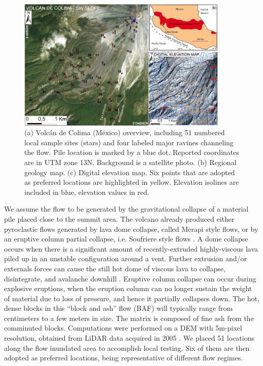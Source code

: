 \documentclass{article}
\begin{document}
\begin{figure}[H]
    \includegraphics[width=0.9\textwidth]{BAF_VolcanDeColima/ColimaFig.jpg}
    \centering
    \caption{(a) Volc{\'a}n de Colima (M{\'e}xico) overview, including 51 numbered local sample sites (stars) and four labeled major ravines channeling the flow. Pile location is marked by a blue dot. Reported coordinates are in UTM zone 13N. Background is a satellite photo. (b) Regional geology map. (c) Digital elevation map. Six points that are adopted as preferred locations are highlighted in yellow. Elevation isolines are included in blue, elevation values in red.}
    \label{fig:Colima-first}
\end{figure}

We assume the flow to be generated by the gravitational collapse of a material pile placed close to the summit area. The volcano already produced either pyroclastic flows generated by lava dome collapse, called Merapi style flows, or by an eruptive column partial collapse, i.e. Soufriere style flows \citep{Macorps2017}. A dome collapse occurs when there is a significant amount of recently-extruded highly-viscous lava piled up in an unstable configuration around a vent. Further extrusion and/or externals forces can cause the still hot dome of viscous lava to collapse, disintegrate, and avalanche downhill \citep{Bursik2005, Wolpert2016, Hyman2018}. Eruptive column collapse can occur during explosive eruptions, when the eruption column can no longer sustain the weight of material due to loss of pressure, and hence it partially collapses down. The hot, dense blocks in this ``block and ash'' flow (BAF) will typically range from centimeters to a few meters in size. The matrix is composed of fine ash from the comminuted blocks. Computations were performed on a DEM with 5m-pixel resolution, obtained from LiDAR data acquired in 2005 \citep{Davila2007, Sulpizio2010}. We placed 51 locations along the flow inundated area to accomplish local testing. Six of them are then adopted as preferred locations, being representative of different flow regimes.
\end{document}
